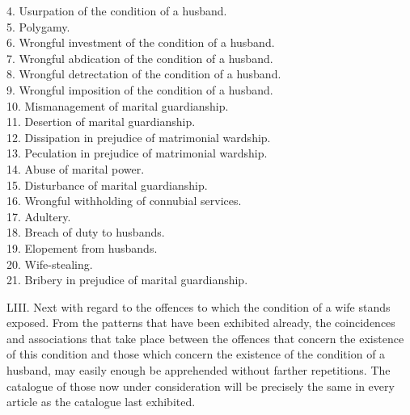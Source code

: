 \documentclass[12pt]{report}
\begin{document}
4. Usurpation of the condition of a husband.\\
5. Polygamy.\\
6. Wrongful investment of the condition of a husband.\\
7. Wrongful abdication of the condition of a husband.\\
8. Wrongful detrectation of the condition of a husband.\\
9. Wrongful imposition of the condition of a husband.\\
10. Mismanagement of marital guardianship.\\
11. Desertion of marital guardianship.\\
12. Dissipation in prejudice of matrimonial wardship.\\
13. Peculation in prejudice of matrimonial wardship.\\
14. Abuse of marital power.\\
15. Disturbance of marital guardianship.\\
16. Wrongful withholding of connubial services.\\
17. Adultery.\\
18. Breach of duty to husbands.\\
19. Elopement from husbands.\\
20. Wife-stealing.\\
21. Bribery in prejudice of marital guardianship.

LIII. Next with regard to the offences to which the condition of a wife
stands exposed. From the patterns that have been exhibited already, the
coincidences and associations that take place between the offences that
concern the existence of this condition and those which concern the
existence of the condition of a husband, may easily enough be
apprehended without farther repetitions. The catalogue of those now
under consideration will be precisely the same in every article as the
catalogue last exhibited.
\end{document}
